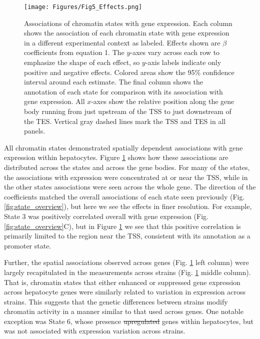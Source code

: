 \documentclass[
  11pt,
]{article}
\providecommand{\DIFaddtex}[1]{{\protect\color{blue}\uwave{#1}}} %
\providecommand{\DIFdeltex}[1]{{\protect\color{red}\sout{#1}}}                      %
\providecommand{\DIFaddbegin}{} %
\providecommand{\DIFaddend}{} %
\providecommand{\DIFdelbegin}{} %
\providecommand{\DIFdelend}{} %
\providecommand{\DIFadd}[1]{\texorpdfstring{\DIFaddtex{#1}}{#1}} %
\providecommand{\DIFdel}[1]{\texorpdfstring{\DIFdeltex{#1}}{}} %
\newcommand{\DIFscaledelfig}{0.5}
\newlength{\DIFdelgraphicswidth} %
\newlength{\DIFdelgraphicsheight} %
\newcommand{\DIFaddincludegraphics}[2][]{{\color{blue}\fbox{\DIFOincludegraphics[#1]{#2}}}} %
\newcommand{\DIFdelincludegraphics}[2][]{%
\sbox{\DIFdelgraphicsbox}{\DIFOincludegraphics[#1]{#2}}%
\settoboxwidth{\DIFdelgraphicswidth}{\DIFdelgraphicsbox} %
\settoboxtotalheight{\DIFdelgraphicsheight}{\DIFdelgraphicsbox} %
\scalebox{\DIFscaledelfig}{%
\parbox[b]{\DIFdelgraphicswidth}{\usebox{\DIFdelgraphicsbox}\\[-\baselineskip] \rule{\DIFdelgraphicswidth}{0em}}\llap{\resizebox{\DIFdelgraphicswidth}{\DIFdelgraphicsheight}{%
\setlength{\unitlength}{\DIFdelgraphicswidth}%
\begin{picture}(1,1)%
\thicklines\linethickness{2pt} %
{\color[rgb]{1,0,0}\put(0,0){\framebox(1,1){}}}%
{\color[rgb]{1,0,0}\put(0,0){\line( 1,1){1}}}%
{\color[rgb]{1,0,0}\put(0,1){\line(1,-1){1}}}%
\end{picture}%
}\hspace*{3pt}}} %
} %
\DeclareRobustCommand{\DIFaddbegin}{\DIFOaddbegin \let\includegraphics\DIFaddincludegraphics} %
\DeclareRobustCommand{\DIFaddend}{\DIFOaddend \let\includegraphics\DIFOincludegraphics} %
\DeclareRobustCommand{\DIFdelbegin}{\DIFOdelbegin \let\includegraphics\DIFdelincludegraphics} %
\DeclareRobustCommand{\DIFdelend}{\DIFOaddend \let\includegraphics\DIFOincludegraphics} %
\begin{document}
\begin{figure}[ht!]
\texttt{[image: Figures/Fig5\_Effects.png]}
\caption{Associations of chromatin states with gene expression. Each 
column shows the association of each chromatin state with gene 
expression in a different experimental context as labeled. 
Effects shown are $\beta$ coefficients from equation 1. The 
$y$-axes vary across each row to emphasize the shape of each effect, 
so $y$-axis labels indicate only positive and negative effects. 
Colored areas show the 95\% confidence interval around each 
estimate. The final column shows the annotation of each state for 
comparison with its association with gene expression. All $x$-axes 
show the relative position along the gene body running from just 
upstream of the TSS to just downstream of the TES. Vertical gray 
dashed lines mark the TSS and TES in all panels.
}
\label{fig:state_effects}
\end{figure}

All chromatin states demonstrated spatially dependent associations with
gene expression within hepatocytes. Figure \ref{fig:state_effects} shows
how these associations are distributed across the states and across the
gene bodies. For many of the states, the associations with expression
were concentrated at or near the TSS, while in the other states
associations were seen across the whole gene. The direction of the
coefficients matched the overall associations of each state seen
previously (Fig. \ref{fig:state_overview}), but here we see the effects
in finer resolution. For example, State 3 was positively correlated
overall with gene expression (Fig. \ref{fig:state_overview}C), but in
Figure \ref{fig:state_effects} we see that this positive correlation is
primarily limited to the region near the TSS, consistent with its
annotation as a promoter state.

Further, the spatial associations observed across genes (Fig.
\ref{fig:state_effects} left column) were largely recapitulated in the
measurements across strains (Fig. \ref{fig:state_effects} middle
column). That is, chromatin states that either enhanced or suppressed
gene expression across hepatocyte genes were similarly related to
variation in expression across strains. This suggests that the genetic
differences between strains modify chromatin activity in a manner
similar to that used across genes. One notable exception was State 6,
whose presence \DIFdelbegin \DIFdel{upregulated }\DIFdelend \DIFaddbegin \DIFadd{up-regulated }\DIFaddend genes within hepatocytes, but was not
associated with expression variation across strains.
\end{document}
